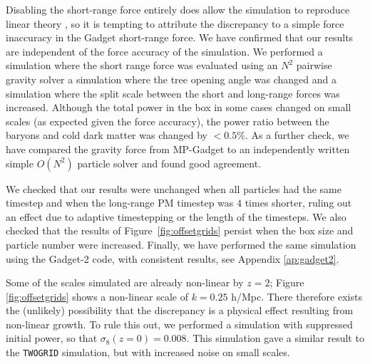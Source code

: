 \documentclass[a4paper,11pt]{article}
\begin{document}
Disabling the short-range force entirely does allow the simulation to reproduce linear theory \cite{Angulo:2013}, so it is tempting to attribute the discrepancy to a simple force inaccuracy in the Gadget short-range force. We have confirmed that our results are independent of the force accuracy of the simulation. We performed a simulation where the short range force was evaluated using an $N^2$ pairwise gravity solver a simulation where the tree opening angle was changed and a simulation where the split scale between the short and long-range forces was increased. Although the total power in the box in some cases changed on small scales (as expected given the force accuracy), the power ratio between the baryons and cold dark matter was changed by $<0.5\%$. As a further check, we have compared the gravity force from MP-Gadget to an independently written simple $O(N^2)$ particle solver and found good agreement.

We checked that our results were unchanged when all particles had the same timestep and when the long-range PM timestep was $4$ times shorter, ruling out an effect due to adaptive timestepping or the length of the timesteps. We also checked that the results of Figure~\ref{fig:offsetgrids} persist when the box size and particle number were increased. Finally, we have performed the same simulation using the Gadget-2 code, with consistent results, see Appendix \ref{ap:gadget2}.

Some of the scales simulated are already non-linear by $z=2$; Figure \ref{fig:offsetgrids} shows a non-linear scale of $k = 0.25$ h/Mpc. There therefore exists the (unlikely) possibility that the discrepancy is a physical effect resulting from non-linear growth. To rule this out, we performed a simulation with suppressed initial power, so that $\sigma_8(z=0) = 0.008$. This simulation gave a similar result to the \texttt{TWOGRID} simulation, but with increased noise on small scales.
\end{document}

